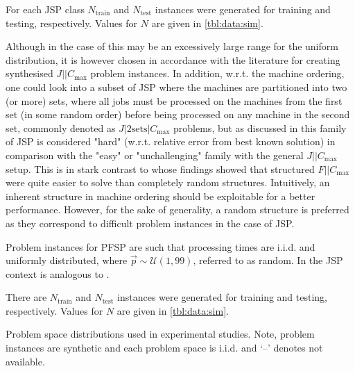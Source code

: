 \documentclass[smallextended]{svjour3}
\begin{document}
For each JSP class $N_{\text{train}}$  and $N_{\text{test}}$ instances were generated for training and testing, respectively. Values for $N$ are given in \cref{tbl:data:sim}. 

Although in the case of   this may be an excessively large range for the uniform distribution, it is however chosen in accordance with the literature \citep{Demirkol98} for creating synthesised $J||C_{\max}$ problem instances. In addition, w.r.t. the machine ordering, one could look into a subset of JSP where the machines are partitioned into two (or more) sets, where all jobs must be processed on the machines from the first set (in some random order) before being processed on any machine in the second set, commonly denoted as $J|2\textrm{sets}|C_{\max}$ problems, but as discussed in \cite{orlib_swv} this family of JSP is considered "hard" (w.r.t. relative error from best known solution) in comparison with the "easy" or "unchallenging" family with the general $J||C_{\max}$ setup. %
This is in stark contrast to \citet{Whitley} whose findings showed that structured $F||C_{\max}$ were quite easier to solve than completely random structures. 
Intuitively, an inherent structure in machine ordering should be exploitable for a better performance.  However, for the sake of generality, a random structure is preferred as they correspond to difficult problem instances in the case of JSP. 

Problem instances for PFSP are such that processing times are i.i.d. and uniformly distributed, 
  where $\vec{p}\sim\mathcal{U}(1,99)$, referred to as random. In the JSP context   is analogous to .

There are $N_{\text{train}}$  and $N_{\text{test}}$ instances were generated for training and testing, respectively. Values for $N$ are given in \cref{tbl:data:sim}. 

\begin{table}\centering
\caption[Problem space distributions used in experimental studies.]{Problem space distributions used in experimental studies. Note, problem instances are synthetic and each problem space is i.i.d. and `--' denotes not available.}\label{tbl:data:sim}

\end{table}
\end{document}
